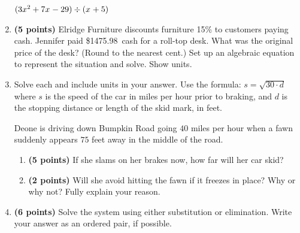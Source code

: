 \documentclass[12pt]{amsart}
\begin{document}
\begin{enumerate}
\vspace{3mm}

$(3x^{2}+7x^{}-29) \div (x^{}+5)$

\vfill  \vfill \vfill
\newpage\def \discount{15}\def \paid{1475.98}\def \rainy{11.61}\def \orcost{1736.45}\def \purcost{1283.46}\def \orrainy{13.66}
\item {\bf (5 points)} 
 Elridge Furniture discounts furniture \discount\% to customers paying cash. Jennifer paid \$\paid\ cash for a roll-top desk. What was the original price of the desk? (Round to the nearest cent.) Set up an algebraic equation to represent the situation and solve. Show units.

\vfill 
\def \insvar{30}\def \d{75}\def \zerospeed{47.43}\def \slimit{40}\def \s{60}\def \skidd{120.0}\def \safed{53.333}\def \rsafed{53}

 
\item Solve each and include units in your answer. Use the formula: $s = \sqrt{\insvar \cdot d}$ where $s$ is the speed of the car in miles per hour prior to braking, and $d$ is the stopping distance or length of the skid mark, in feet. 

\vspace{3mm}

Deone is driving down Bumpkin Road going $\slimit$ miles per hour when a fawn suddenly appears $\d$ feet away in the middle of the road. \begin{enumerate}
\item {\bf (5 points)} If she slams on her brakes now, how far will her car skid? \vspace{4cm}
\item {\bf (2 points)} Will she avoid hitting the fawn if it freezes in place? Why or why not? Fully explain your reason. \vspace{3cm}
\end{enumerate}


\newpage\def \xis{-3}\def \yis{-4}\def \nomatcho{[3,2,2,5]}\def \a{-3}\def \c{-2}\def \b{-2}\def \d{-5}\def \polyonesol{17}\def \polytwosol{26}\def \xgoodone{-3x^{}}\def \ygoodone{-2y^{}}\def \xgoodtwo{-2x^{}}\def \ygoodtwo{-5y^{}}\def \unitize{[0,0,1,0,0,1]}\def \mtem{-3}\def \ntem{4}\def \ptem{4}\def \qtem{-3}\def \m{-3}\def \n{4}\def \p{1}\def \q{-3}\def \polytonesol{-7}\def \polyttwosol{9}\def \xtgoodone{-3x^{}}\def \ytgoodone{+4y^{}}\def \xtgoodtwo{x^{}}\def \ytgoodtwo{-3y^{}}
\item {\bf (6 points)} 
 Solve the system using either substitution or elimination. Write your answer as an ordered pair, if possible. 


\end{enumerate}
\end{document}
